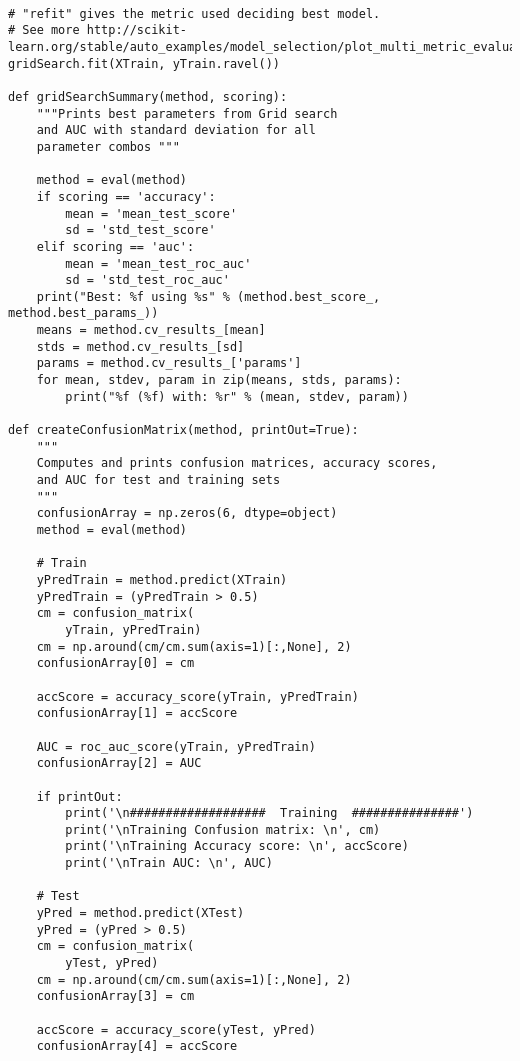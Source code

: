 \documentclass[%
oneside,                 %
final,                   %
10pt]{article}
\begin{document}
\begin{verbatim}

# "refit" gives the metric used deciding best model. 
# See more http://scikit-learn.org/stable/auto_examples/model_selection/plot_multi_metric_evaluation.html
gridSearch.fit(XTrain, yTrain.ravel())

def gridSearchSummary(method, scoring):
    """Prints best parameters from Grid search
    and AUC with standard deviation for all 
    parameter combos """
    
    method = eval(method)
    if scoring == 'accuracy':
        mean = 'mean_test_score'
        sd = 'std_test_score'
    elif scoring == 'auc':
        mean = 'mean_test_roc_auc'
        sd = 'std_test_roc_auc'
    print("Best: %f using %s" % (method.best_score_, method.best_params_))
    means = method.cv_results_[mean]
    stds = method.cv_results_[sd]
    params = method.cv_results_['params']
    for mean, stdev, param in zip(means, stds, params):
        print("%f (%f) with: %r" % (mean, stdev, param))

def createConfusionMatrix(method, printOut=True):
    """
    Computes and prints confusion matrices, accuracy scores,
    and AUC for test and training sets 
    """
    confusionArray = np.zeros(6, dtype=object)
    method = eval(method)
    
    # Train
    yPredTrain = method.predict(XTrain)
    yPredTrain = (yPredTrain > 0.5)
    cm = confusion_matrix(
        yTrain, yPredTrain) 
    cm = np.around(cm/cm.sum(axis=1)[:,None], 2)
    confusionArray[0] = cm
    
    accScore = accuracy_score(yTrain, yPredTrain)
    confusionArray[1] = accScore
    
    AUC = roc_auc_score(yTrain, yPredTrain)
    confusionArray[2] = AUC
    
    if printOut:
        print('\n###################  Training  ###############')
        print('\nTraining Confusion matrix: \n', cm)
        print('\nTraining Accuracy score: \n', accScore)
        print('\nTrain AUC: \n', AUC)
    
    # Test
    yPred = method.predict(XTest)
    yPred = (yPred > 0.5)
    cm = confusion_matrix(
        yTest, yPred) 
    cm = np.around(cm/cm.sum(axis=1)[:,None], 2)
    confusionArray[3] = cm
    
    accScore = accuracy_score(yTest, yPred)
    confusionArray[4] = accScore
    

\end{verbatim}
\end{document}

